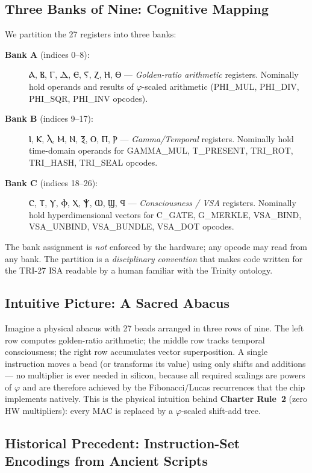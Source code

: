 \subsection{Three Banks of Nine: Cognitive Mapping}
\label{subsec:71:three-banks}

We partition the 27 registers into three banks:
\begin{description}
  \item[\textbf{Bank A} (indices 0--8):] Ⲁ, Ⲃ, Ⲅ, Ⲇ, Ⲉ, Ⲋ, Ⲍ, Ⲏ, Ⲑ —
    \emph{Golden-ratio arithmetic} registers.
    Nominally hold operands and results of $\varphi$-scaled arithmetic
    (PHI\_MUL, PHI\_DIV, PHI\_SQR, PHI\_INV opcodes).
  \item[\textbf{Bank B} (indices 9--17):] Ⲓ, Ⲕ, Ⲗ, Ⲙ, Ⲛ, Ⲝ, Ⲟ, Ⲡ, Ⲣ —
    \emph{Gamma/Temporal} registers.
    Nominally hold time-domain operands for GAMMA\_MUL, T\_PRESENT,
    TRI\_ROT, TRI\_HASH, TRI\_SEAL opcodes.
  \item[\textbf{Bank C} (indices 18--26):] Ⲥ, Ⲧ, Ⲩ, Ⲫ, Ⲭ, Ⲯ, Ⲱ, Ϣ, Ϥ —
    \emph{Consciousness / VSA} registers.
    Nominally hold hyperdimensional vectors for C\_GATE,
    G\_MERKLE, VSA\_BIND, VSA\_UNBIND, VSA\_BUNDLE, VSA\_DOT opcodes.
\end{description}
The bank assignment is \emph{not} enforced by the hardware; any opcode
may read from any bank.  The partition is a \emph{disciplinary
convention} that makes code written for the TRI-27 ISA readable by a
human familiar with the Trinity ontology.

\subsection{Intuitive Picture: A Sacred Abacus}
\label{subsec:71:sacred-abacus}

Imagine a physical abacus with 27 beads arranged in three rows of nine.
The left row computes golden-ratio arithmetic; the middle row tracks
temporal consciousness; the right row accumulates vector superposition.
A single instruction moves a bead (or transforms its value) using only
shifts and additions — no multiplier is ever needed in silicon, because
all required scalings are powers of $\varphi$ and are therefore achieved
by the Fibonacci/Lucas recurrences that the chip implements natively.
This is the physical intuition behind \textbf{Charter Rule~2} (zero HW
multipliers): every MAC is replaced by a $\varphi$-scaled shift-add tree.

\subsection{Historical Precedent: Instruction-Set Encodings from Ancient Scripts}
\label{subsec:71:historical}

